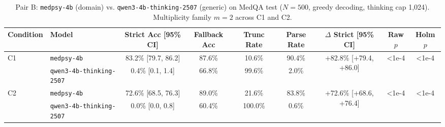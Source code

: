 \begin{table}[t]
\centering
\small
\caption{Pair B: \texttt{medpsy-4b} (domain) vs. \texttt{qwen3-4b-thinking-2507} (generic) on MedQA test ($N=500$, greedy decoding, thinking cap 1,024). Multiplicity family $m=2$ across C1 and C2.}
\label{tab:pair_b_medqa}
\begin{tabular}{llccccccc}
\toprule
Condition & Model & Strict Acc [95\% CI] & Fallback Acc & Trunc Rate & Parse Rate & $\Delta$ Strict [95\% CI] & Raw $p$ & Holm $p$ \\
\midrule

C1 & \texttt{medpsy-4b} & 83.2\% [79.7, 86.2] & 87.6\% & 10.6\% & 90.4\% & \multirow{2}{*}{+82.8\% [+79.4, +86.0]} & \multirow{2}{*}{<1e-4} & \multirow{2}{*}{<1e-4} \\

 & \texttt{qwen3-4b-thinking-2507} & 0.4\% [0.1, 1.4] & 66.8\% & 99.6\% & 2.0\% & & & \\

\midrule

C2 & \texttt{medpsy-4b} & 72.6\% [68.5, 76.3] & 89.0\% & 21.6\% & 83.8\% & \multirow{2}{*}{+72.6\% [+68.6, +76.4]} & \multirow{2}{*}{<1e-4} & \multirow{2}{*}{<1e-4} \\

 & \texttt{qwen3-4b-thinking-2507} & 0.0\% [0.0, 0.8] & 60.4\% & 100.0\% & 0.6\% & & & \\

\bottomrule
\end{tabular}
\end{table}
